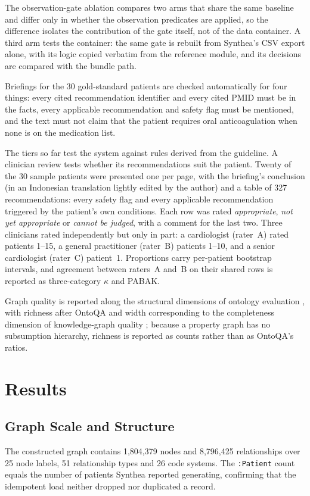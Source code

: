 \documentclass[conference]{IEEEtran}
\begin{document}
The observation-gate ablation compares two arms that share the same baseline and differ
only in whether the observation predicates are applied, so the difference isolates the
contribution of the gate itself, not of the data container. A third arm tests the
container: the same gate is rebuilt from Synthea's CSV export alone, with its logic copied
verbatim from the reference module, and its decisions are compared with the bundle path.

Briefings for the 30 gold-standard patients are checked automatically for four things:
every cited recommendation identifier and every cited PMID must be in the facts, every
applicable recommendation and safety flag must be mentioned, and the text must not claim
that the patient requires oral anticoagulation when none is on the medication list.

The tiers so far test the system against rules derived from the guideline. A clinician
review tests whether its recommendations suit the patient. Twenty of the 30 sample patients
were presented one per page, with the briefing's conclusion (in an Indonesian translation
lightly edited by the author) and a table of 327 recommendations: every safety flag and
every applicable recommendation triggered by the patient's own conditions. Each row was
rated \emph{appropriate}, \emph{not yet appropriate} or \emph{cannot be judged}, with a
comment for the last two. Three clinicians rated independently but only in part: a
cardiologist (rater~A) rated patients 1--15, a general practitioner (rater~B) patients
1--10, and a senior cardiologist (rater~C) patient~1. Proportions carry per-patient
bootstrap intervals, and agreement between raters~A and~B on their shared rows is reported
as three-category $\kappa$ and PABAK.

Graph quality is reported along the
structural dimensions of ontology evaluation \cite{gangemi2006}, with richness after OntoQA
\cite{tartir2005} and width corresponding to the completeness dimension of knowledge-graph
quality \cite{issa2021}; because a property graph has no subsumption hierarchy, richness is
reported as counts rather than as OntoQA's ratios.

\section{Results}

\subsection{Graph Scale and Structure}
The constructed graph contains 1,804,379 nodes and 8,796,425 relationships over 25 node
labels, 51 relationship types and 26 code systems. The \texttt{:Patient} count equals the
number of patients Synthea reported generating, confirming that the idempotent load neither
dropped nor duplicated a record.
\end{document}
